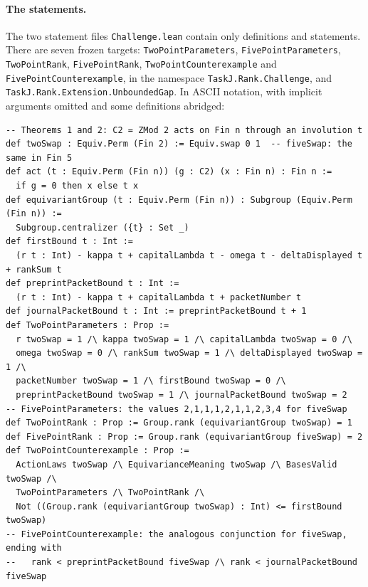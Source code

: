\documentclass[11pt]{article}
\theoremstyle{remark}
\begin{document}
\paragraph{The statements.}
The two statement files \texttt{Challenge.lean} contain only definitions
and statements. There are seven frozen targets: \texttt{TwoPointParameters},
\texttt{FivePointParameters}, \texttt{TwoPointRank}, \texttt{FivePointRank},
\texttt{TwoPointCounterexample} and \texttt{FivePointCounterexample}, in the
namespace \texttt{TaskJ.\allowbreak Rank.\allowbreak Challenge}, and
\texttt{TaskJ.\allowbreak Rank.\allowbreak Extension.\allowbreak UnboundedGap}.
In ASCII notation, with implicit arguments omitted and some definitions
abridged:
{\footnotesize
\begin{verbatim}
-- Theorems 1 and 2: C2 = ZMod 2 acts on Fin n through an involution t
def twoSwap : Equiv.Perm (Fin 2) := Equiv.swap 0 1  -- fiveSwap: the same in Fin 5
def act (t : Equiv.Perm (Fin n)) (g : C2) (x : Fin n) : Fin n :=
  if g = 0 then x else t x
def equivariantGroup (t : Equiv.Perm (Fin n)) : Subgroup (Equiv.Perm (Fin n)) :=
  Subgroup.centralizer ({t} : Set _)
def firstBound t : Int :=
  (r t : Int) - kappa t + capitalLambda t - omega t - deltaDisplayed t + rankSum t
def preprintPacketBound t : Int :=
  (r t : Int) - kappa t + capitalLambda t + packetNumber t
def journalPacketBound t : Int := preprintPacketBound t + 1
def TwoPointParameters : Prop :=
  r twoSwap = 1 /\ kappa twoSwap = 1 /\ capitalLambda twoSwap = 0 /\
  omega twoSwap = 0 /\ rankSum twoSwap = 1 /\ deltaDisplayed twoSwap = 1 /\
  packetNumber twoSwap = 1 /\ firstBound twoSwap = 0 /\
  preprintPacketBound twoSwap = 1 /\ journalPacketBound twoSwap = 2
-- FivePointParameters: the values 2,1,1,1,2,1,1,2,3,4 for fiveSwap
def TwoPointRank : Prop := Group.rank (equivariantGroup twoSwap) = 1
def FivePointRank : Prop := Group.rank (equivariantGroup fiveSwap) = 2
def TwoPointCounterexample : Prop :=
  ActionLaws twoSwap /\ EquivarianceMeaning twoSwap /\ BasesValid twoSwap /\
  TwoPointParameters /\ TwoPointRank /\
  Not ((Group.rank (equivariantGroup twoSwap) : Int) <= firstBound twoSwap)
-- FivePointCounterexample: the analogous conjunction for fiveSwap, ending with
--   rank < preprintPacketBound fiveSwap /\ rank < journalPacketBound fiveSwap


\end{verbatim}}
\end{document}

